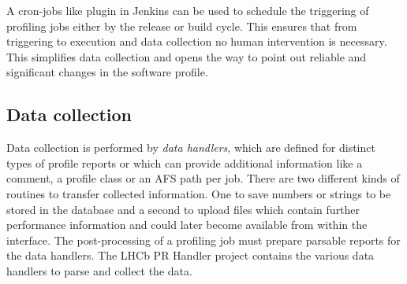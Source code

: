 \documentclass[a4paper]{jpconf}
\begin{document}
A cron-jobs like plugin in Jenkins can be used to schedule the triggering of profiling jobs either by the release or build cycle. This ensures that from triggering to execution and data collection no human intervention is necessary. This simplifies data collection and opens the way to point out reliable and significant changes in the software profile.

\subsection{Data collection}
\label{sec:data_collection}

Data collection is performed by \textit{data handlers}, which are defined for distinct types of profile reports or which can provide additional information like a comment, a profile class or an AFS path per job. There are two different kinds of routines to transfer collected information. One to save numbers or strings to be stored in the database and a second to upload files which contain further performance information and could later become available from within the interface. The post-processing of a profiling job must prepare parsable reports for the data handlers. The LHCb PR Handler project contains the various data handlers to parse and collect the data.
\end{document}

